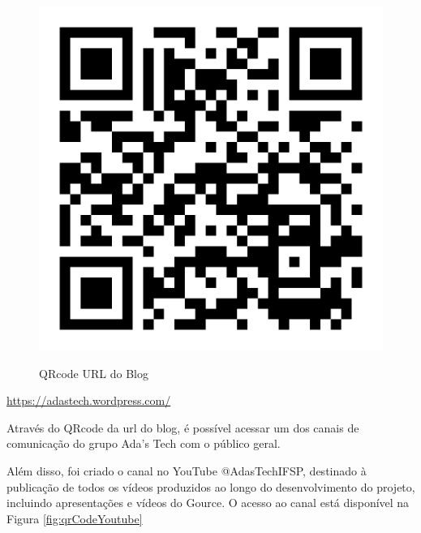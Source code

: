 \begin{figure}[ht]
        \centering
        \href{https://adastech.wordpress.com/}{
        \includegraphics[scale=0.5]{images/qrCode-blog.png}
        }        
        \caption{QRcode URL do Blog}
        \label{fig:qrcodeBlog}
    \end{figure}
\href{https://adastech.wordpress.com/}{https://adastech.wordpress.com/}

Através do QRcode da \ac{url} do blog, é possível acessar um dos canais de comunicação do grupo Ada's Tech com o público geral. 

\newpage
Além disso, foi criado o canal no YouTube @AdasTechIFSP, destinado à publicação de todos os vídeos produzidos ao longo do desenvolvimento do projeto, incluindo apresentações e vídeos do Gource. O acesso ao canal está disponível na Figura \ref{fig:qrCodeYoutube}

